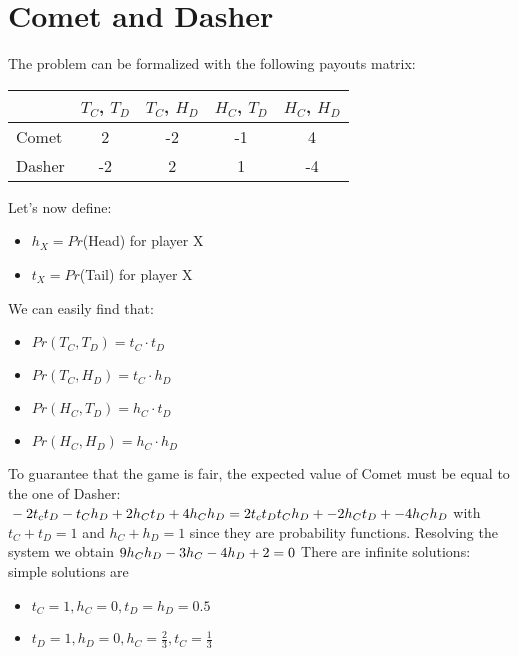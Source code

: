 \section{Comet and Dasher}
The problem can be formalized with the following payouts matrix:
\begin{center}
	\begin{tabular}{l*{4}{c}}
		& $T_C$, $T_D$ & $T_C$, $H_D$ & $H_C$, $T_D$ & $H_C$, $H_D$ \\
		\hline
		Comet & 2 & -2 & -1 & 4 \\
		\hline
		Dasher & -2 & 2 & 1 & -4 \\
	\end{tabular}
	
\end{center}
Let's now define:
\begin{itemize}
\item $h_X = Pr$(Head) for player X
\item $t_X = Pr$(Tail) for player X
\end{itemize}
We can easily find that:
\begin{itemize}
\item $Pr(T_C, T_D) = t_C \cdot t_D$
\item $Pr(T_C, H_D) = t_C \cdot h_D$
\item $Pr(H_C, T_D) = h_C \cdot t_D$
\item $Pr(H_C, H_D) = h_C \cdot h_D$
\end{itemize}
To guarantee that the game is fair, the expected value of Comet must be equal to the one of Dasher:
$\newline\newline-2 t_c t_D -t_C h_D + 2h_C t_D + 4 h_C h_D = 2 t_c t_D t_C h_D + -2h_C t_D + -4 h_C h_D\newline\newline$
with $t_C + t_D = 1$ and $h_C + h_D = 1$ since they are probability functions.
Resolving the system we obtain 
$\newline\newline9h_C h_D -3h_C - 4h_D +2 = 0\newline\newline$
There are infinite solutions: simple solutions are 
\begin{itemize}
	\item $t_C = 1, h_C = 0, t_D = h_D = 0.5$
	\item $t_D = 1, h_D = 0, h_C = \frac{2}{3}, t_C = \frac{1}{3}$	
\end{itemize}

